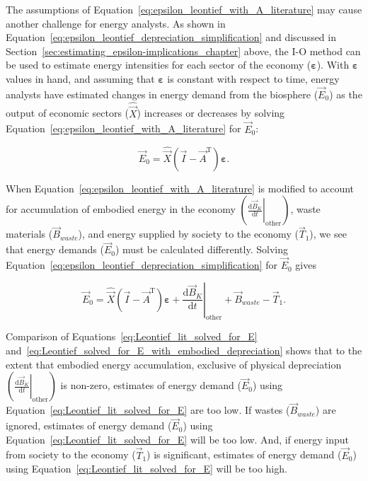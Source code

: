 The assumptions of Equation~\ref{eq:epsilon_leontief_with_A_literature}
may cause another challenge for energy analysts. 
As shown in 
Equation~\ref{eq:epsilon_leontief_depreciation_simplification}
and discussed in Section~\ref{sec:estimating_epsilon-implications_chapter} above, 
the I-O method can be used to estimate energy intensities 
for each sector of the economy ($\boldsymbol{\varepsilon}$). 
With $\boldsymbol{\varepsilon}$ values in hand,
and assuming that $\boldsymbol{\varepsilon}$ is constant with respect to time,
energy analysts have estimated changes in energy demand 
from the biosphere ($\vec{E}_{0}$) 
as the output of economic sectors ($\hat{\vec{X}}$) 
increases or decreases by solving 
Equation~\ref{eq:epsilon_leontief_with_A_literature} 
for $\vec{E}_{0}$:

\begin{equation} \label{eq:Leontief_lit_solved_for_E}
	\vec{E}_{0} 
	= \hat{\vec{X}}(\vec{I} - \vec{A}^{\mathrm{T}})\boldsymbol{\varepsilon}.
\end{equation}

When Equation~\ref{eq:epsilon_leontief_with_A_literature}
is modified to account for accumulation of embodied energy 
in the economy 
$\left( \left. \frac{\mathrm{d}\vec{B}_{K}}{\mathrm{d}t} \right|_{\mathrm{other}} \right)$,
waste materials ($\vec{B}_{waste}$), and
energy supplied by society to the economy ($\vec{T}_{1}$),
we see that energy demands ($\vec{E}_{0}$) must be calculated differently. 
Solving Equation~\ref{eq:epsilon_leontief_depreciation_simplification} 
for $\vec{E}_{0}$ gives 

\begin{equation} \label{eq:Leontief_solved_for_E_with_embodied_depreciation}
	\vec{E}_{0} 
	= \hat{\vec{X}}
		(\vec{I} - \vec{A}^{\mathrm{T}})
		\boldsymbol{\varepsilon} 
	+ \left. \frac{\mathrm{d}\vec{B}_{K}}{\mathrm{d}t} \right|_{\mathrm{other}}
	+ \vec{B}_{waste}
	- \vec{T}_{1}.
\end{equation}

\noindent{}Comparison of Equations~\ref{eq:Leontief_lit_solved_for_E} 
and~\ref{eq:Leontief_solved_for_E_with_embodied_depreciation}
shows that to the extent that embodied energy accumulation,
exclusive of physical depreciation
$\left( \left. \frac{\mathrm{d}\vec{B}_{K}}{\mathrm{d}t} \right|_{\mathrm{other}} \right)$
is non-zero, estimates of energy demand ($\vec{E}_{0}$) using 
Equation~\ref{eq:Leontief_lit_solved_for_E} are too low. 
If wastes ($\vec{B}_{waste}$) are ignored, 
estimates of energy demand ($\vec{E}_{0}$) using 
Equation~\ref{eq:Leontief_lit_solved_for_E} will be too low. 
And, if energy input from society to the economy ($\vec{T}_{1}$) is significant,
estimates of energy demand ($\vec{E}_{0}$) using 
Equation~\ref{eq:Leontief_lit_solved_for_E} will be too high. 

